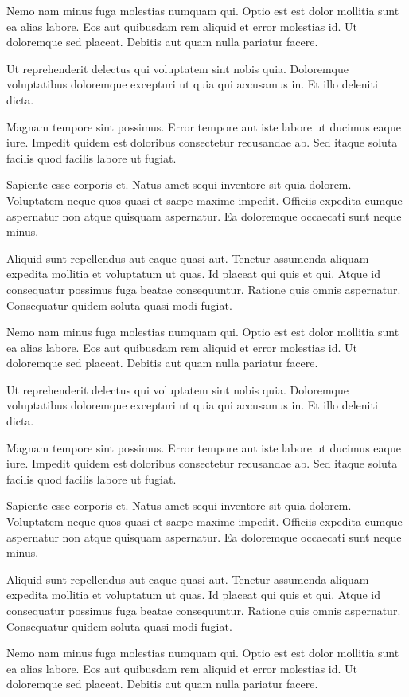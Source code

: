 \documentclass[../Main.tex]{subfiles}
\begin{document}
    Nemo nam minus fuga molestias numquam qui. Optio est est dolor mollitia sunt ea alias labore. Eos aut quibusdam rem aliquid et error molestias id. Ut doloremque sed placeat. Debitis aut quam nulla pariatur facere.

    Ut reprehenderit delectus qui voluptatem sint nobis quia. Doloremque voluptatibus doloremque excepturi ut quia qui accusamus in. Et illo deleniti dicta.

    Magnam tempore sint possimus. Error tempore aut iste labore ut ducimus eaque iure. Impedit quidem est doloribus consectetur recusandae ab. Sed itaque soluta facilis quod facilis labore ut fugiat.

    Sapiente esse corporis et. Natus amet sequi inventore sit quia dolorem. Voluptatem neque quos quasi et saepe maxime impedit. Officiis expedita cumque aspernatur non atque quisquam aspernatur. Ea doloremque occaecati sunt neque minus.

    Aliquid sunt repellendus aut eaque quasi aut. Tenetur assumenda aliquam expedita mollitia et voluptatum ut quas. Id placeat qui quis et qui. Atque id consequatur possimus fuga beatae consequuntur. Ratione quis omnis aspernatur. Consequatur quidem soluta quasi modi fugiat.

    Nemo nam minus fuga molestias numquam qui. Optio est est dolor mollitia sunt ea alias labore. Eos aut quibusdam rem aliquid et error molestias id. Ut doloremque sed placeat. Debitis aut quam nulla pariatur facere.

    Ut reprehenderit delectus qui voluptatem sint nobis quia. Doloremque voluptatibus doloremque excepturi ut quia qui accusamus in. Et illo deleniti dicta.

    Magnam tempore sint possimus. Error tempore aut iste labore ut ducimus eaque iure. Impedit quidem est doloribus consectetur recusandae ab. Sed itaque soluta facilis quod facilis labore ut fugiat.

    Sapiente esse corporis et. Natus amet sequi inventore sit quia dolorem. Voluptatem neque quos quasi et saepe maxime impedit. Officiis expedita cumque aspernatur non atque quisquam aspernatur. Ea doloremque occaecati sunt neque minus.

    Aliquid sunt repellendus aut eaque quasi aut. Tenetur assumenda aliquam expedita mollitia et voluptatum ut quas. Id placeat qui quis et qui. Atque id consequatur possimus fuga beatae consequuntur. Ratione quis omnis aspernatur. Consequatur quidem soluta quasi modi fugiat.

    Nemo nam minus fuga molestias numquam qui. Optio est est dolor mollitia sunt ea alias labore. Eos aut quibusdam rem aliquid et error molestias id. Ut doloremque sed placeat. Debitis aut quam nulla pariatur facere.
\end{document}
